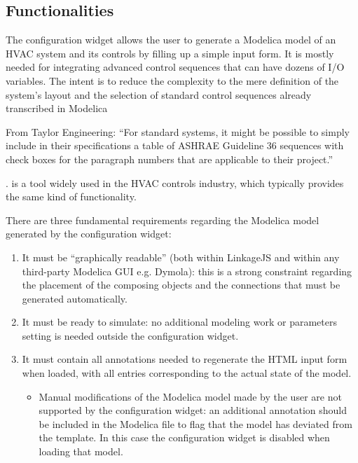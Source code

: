 \documentclass[letterpaper,10pt, openany,english]{sphinxmanual}
\begin{document}
\subsection{Functionalities}
\label{\detokenize{requirements:functionalities}}
The configuration widget allows the user to generate a Modelica model of an HVAC system and its controls by filling up a simple input form.
It is mostly needed for integrating advanced control sequences that can have dozens of I/O variables.
The intent is to reduce the complexity to the mere definition of the system’s layout and the selection of standard control sequences already transcribed in Modelica %
\begin{footnote}[2]\sphinxAtStartFootnote
From Taylor Engineering: “For standard systems, it might be possible to simply include in their specifications a table of ASHRAE Guideline 36 sequences with check boxes for the paragraph numbers that are applicable to their project.”
%
\end{footnote}.
 is a tool widely used in the HVAC controls industry, which typically provides the same kind of functionality.

There are three fundamental requirements regarding the Modelica model generated by the configuration widget:
\begin{enumerate}
%
\item {} 
It must be “graphically readable” (both within LinkageJS and within any third-party Modelica GUI e.g. Dymola): this is a strong constraint regarding the placement of the composing objects and the connections that must be generated automatically.

\item {} 
It must be ready to simulate: no additional modeling work or parameters setting is needed outside the configuration widget.

\item {} 
It must contain all annotations needed to regenerate the HTML input form when loaded, with all entries corresponding to the actual state of the model.
\begin{itemize}
\item {} 
Manual modifications of the Modelica model made by the user are not supported by the configuration widget: an additional annotation should be included in the Modelica file to flag that the model has deviated from the template. In this case the configuration widget is disabled when loading that model.

\end{itemize}

\end{enumerate}
\end{document}
